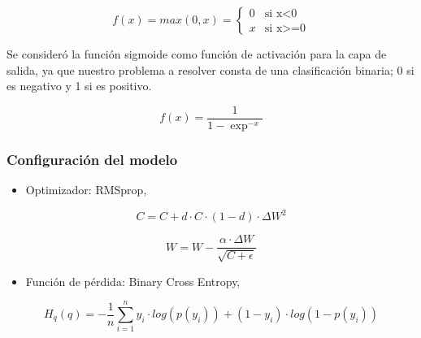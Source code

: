 \documentclass[sigconf, nonacm, spanish]{acmart}
\begin{document}
\begin{equation}
  f(x) = max (0,x) =  \left \{ \begin{matrix} 0 & \mbox{si x<0}
\\ x & \mbox{si x>=0}\end{matrix}\right. 
\end{equation} 

Se consideró la función sigmoide como función de activación para la capa de salida, ya que nuestro problema a resolver consta de una clasificación binaria; 0 si es negativo y 1 si es positivo.

\begin{equation}
  f(x) =\frac{1}{1-\exp^{-x}}
\end{equation} 


\subsubsection{Configuración del modelo}

\begin{itemize}
    \item Optimizador: RMSprop,
\end{itemize}    
\begin{equation}
  C = C +d \cdot C \cdot (1-d) \cdot \Delta W^2
\end{equation}  

\begin{equation}
  W = W - \frac{\alpha \cdot \Delta W}{\sqrt{C + \epsilon}}
\end{equation} 
    



\begin{itemize}
    \item Función de pérdida: Binary Cross Entropy,
\end{itemize}    

\begin{equation}
H_q(q) = - \frac{1}{n} \sum_{i=1}^n y_i \cdot log(p(y_i)) + (1 - y_i) \cdot log(1-p(y_i))
\end{equation}
\end{document}
